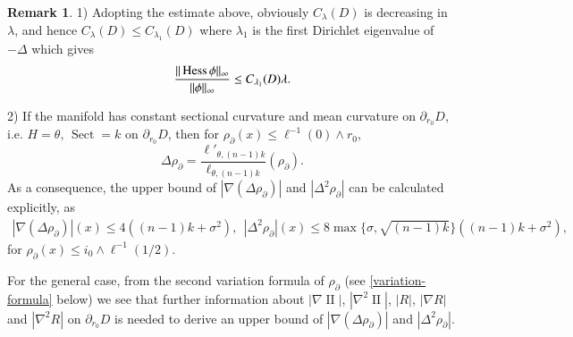 \documentclass[11pt,reqno]{amsart}
\theoremstyle{definition} \newtheorem{remark}[theorem]{Remark}
\numberwithin{equation}{section}
\def\Sect{{\operatorname{Sect}}}
\newcommand\1{\mathbbm{1}}
\def\II{{\operatorname{II}}}
\begin{document}
\begin{remark}\label{rem0}
1)  Adopting the estimate above, obviously $C_{\lambda}(D)$ is
   decreasing in $\lambda$, and hence
  $C_{\lambda}(D)\leq C_{\lambda_1}(D)$
  where $\lambda_1$ is the first Dirichlet eigenvalue of $-\Delta$
  which gives
  \begin{align*}
   \frac{\|\operatorname{Hess} \phi\|_{\infty}}{\|\phi\|_{\infty}}\leq C_{\lambda_1}(D)\lambda.
  \end{align*}
 
2) If the manifold has constant sectional curvature and mean curvature on $\partial_{r_0}D$, i.e. $H=\theta,\,  \Sect=k$ on $\partial_{r_0}D$, then for $\rho_{\partial}(x)\leq \ell^{-1}(0)\wedge r_0$,
 $$\Delta \rho_{\partial}=\frac{\ell'_{\theta, (n-1)k}}{\ell_{\theta, (n-1)k}}(\rho_{\partial}).$$
 As a consequence, the upper bound of $|\nabla (\Delta \rho_{\partial })|$ and  $|\Delta^2 \rho_{\partial}|$ can be calculated explicitly, as
 \begin{align*}
 |\nabla (\Delta \rho_{\partial })|(x)\leq 4((n-1)k+\sigma^2),\ \ |\Delta^2 \rho_{\partial}|(x)\leq 8\max\big\{\sigma, \sqrt{(n-1)k}\big\}((n-1)k+\sigma^2),
 \end{align*}
 for $\rho_{\partial} (x)\leq i_0\wedge \ell^{-1}({1}/{2})$.
 
 For the general  case, from the  second variation formula of $\rho_{\partial}$ (see \eqref{variation-formula} below) we see that
 further information about $|\nabla \II|$, $|\nabla^2\II|$, $|R|$, $|\nabla R|$ and $|\nabla^2 R|$ on $\partial_{r_0}D$ is needed to derive an upper bound of 
  $|\nabla (\Delta \rho_{\partial })|$ and  $|\Delta^2 \rho_{\partial}|$.
 \end{remark}
\end{document}
